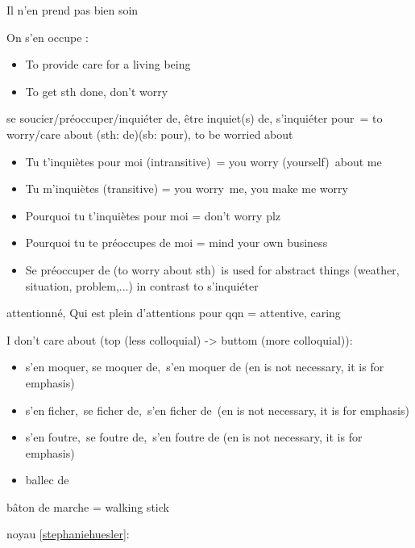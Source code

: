 Il n'en prend pas bien soin~

On s'en occupe :~

\begin{itemize}
\item
  To provide care for a living being
\item
  To get sth done, don't worry~
\end{itemize}

se soucier/préoccuper/inquiéter de, être inquiet(s) de, s'inquiéter
pour~= to worry/care about (sth: de)(sb: pour), to be worried about

\begin{itemize}
\item
  Tu t'inquiètes pour moi (intransitive)~= you worry (yourself)~about
  me~
\item
  Tu m'inquiètes (transitive) = you worry~me, you make me worry~
\item
  Pourquoi tu t'inquiètes pour moi = don't worry plz
\item
  Pourquoi tu te préoccupes de moi = mind your own business~
\item
  Se préoccuper de (to worry about sth)~is used for abstract things
  (weather, situation, problem,...) in contrast to s'inquiéter
\end{itemize}

attentionné, Qui est plein d'attentions pour qqn = attentive, caring

I don't care about (top (less colloquial) -\textgreater{} buttom (more
colloquial)):

\begin{itemize}
\item
  s'en moquer, se moquer de,~s'en moquer de (en is not necessary, it is
  for emphasis)
\item
  s'en ficher,~se ficher de,~s'en ficher de~(en is not necessary, it is
  for emphasis)
\item
  s'en foutre,~se foutre de,~s'en foutre de (en is not necessary, it is
  for emphasis)
\item
  ballec de
\end{itemize}

bâton de marche = walking stick

noyau
{[}\href{https://stephaniehuesler.com/2020/01/04/seeds-pits-pips-or-stones/\#:~:text=Pits\%2520are\%2520found\%2520in\%2520fruits\%2C\%252C\%2520avocadoes\%252C\%2520olives\%2520and\%2520dates.}{stephaniehuesler}{]}:

